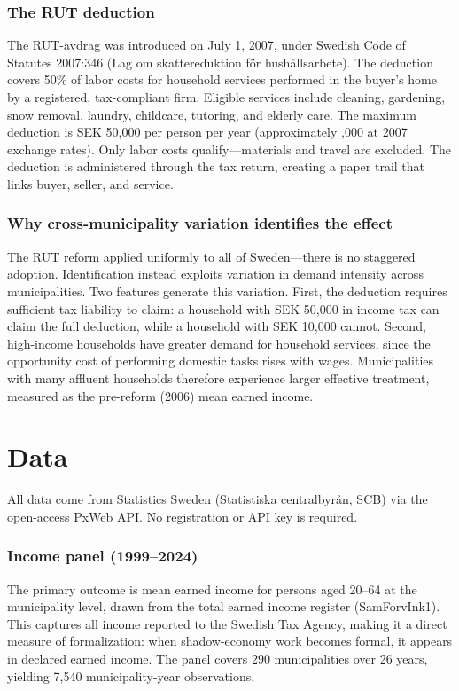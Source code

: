 \documentclass[12pt]{article}
\begin{document}
\subsubsection*{The RUT deduction} The RUT-avdrag was introduced on July 1, 2007, under Swedish Code of Statutes 2007:346 (Lag om skattereduktion f\"{o}r hush\r{a}llsarbete). The deduction covers 50\% of labor costs for household services performed in the buyer's home by a registered, tax-compliant firm. Eligible services include cleaning, gardening, snow removal, laundry, childcare, tutoring, and elderly care. The maximum deduction is SEK 50,000 per person per year (approximately ,000 at 2007 exchange rates). Only labor costs qualify---materials and travel are excluded. The deduction is administered through the tax return, creating a paper trail that links buyer, seller, and service.

\subsubsection*{Why cross-municipality variation identifies the effect} The RUT reform applied uniformly to all of Sweden---there is no staggered adoption. Identification instead exploits variation in demand intensity across municipalities. Two features generate this variation. First, the deduction requires sufficient tax liability to claim: a household with SEK 50,000 in income tax can claim the full deduction, while a household with SEK 10,000 cannot. Second, high-income households have greater demand for household services, since the opportunity cost of performing domestic tasks rises with wages. Municipalities with many affluent households therefore experience larger effective treatment, measured as the pre-reform (2006) mean earned income.


\section{Data}

All data come from Statistics Sweden (Statistiska centralbyr\r{a}n, SCB) via the open-access PxWeb API. No registration or API key is required.

\subsubsection*{Income panel (1999--2024)} The primary outcome is mean earned income for persons aged 20--64 at the municipality level, drawn from the total earned income register (SamForvInk1). This captures all income reported to the Swedish Tax Agency, making it a direct measure of formalization: when shadow-economy work becomes formal, it appears in declared earned income. The panel covers 290 municipalities over 26 years, yielding 7,540 municipality-year observations.
\end{document}
